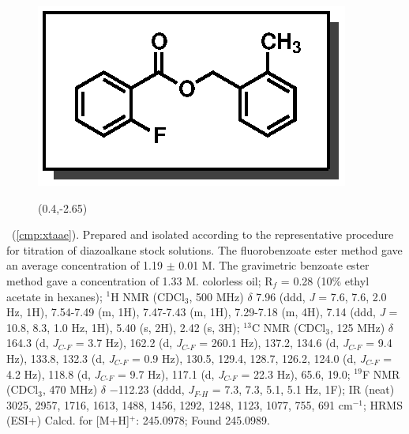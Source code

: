 \pagebreak
\begin{figure}
  \vspace{-18pt}
  \begin{center}
    \includegraphics[scale=0.8]{chp_asymmetric/images/xtaae}
          \begin{textblock}{1}(0.4,-2.65)  \end{textblock}
  \end{center}
  \vspace{-35pt}
\end{figure}\noindent \textbf{\CMPxtaae}\ (\ref{cmp:xtaae}). Prepared and
isolated according to the representative procedure for titration of diazoalkane
stock solutions. The fluorobenzoate ester method gave an average concentration
of 1.19 $\pm$ 0.01 M. The gravimetric benzoate ester method gave a concentration
of 1.33 M. colorless oil; R$_f$ = 0.28 (10\% ethyl acetate in hexanes); $^1$H
NMR (CDCl$_3$, 500 MHz) $\delta$ 7.96 (ddd, \textit{J} = 7.6, 7.6, 2.0 Hz, 1H),
7.54-7.49 (m, 1H), 7.47-7.43 (m, 1H), 7.29-7.18 (m, 4H), 7.14 (ddd, \textit{J} =
10.8, 8.3, 1.0 Hz, 1H), 5.40 (s, 2H), 2.42 (s, 3H); $^{13}$C NMR (CDCl$_3$, 125
MHz) $\delta$ 164.3 (d, \textit{J}$_{C\mbox{-}F}$ = 3.7 Hz), 162.2 (d,
\textit{J}$_{C\mbox{-}F}$ = 260.1 Hz), 137.2, 134.6 (d,
\textit{J}$_{C\mbox{-}F}$ = 9.4 Hz), 133.8, 132.3 (d, \textit{J}$_{C\mbox{-}F}$
= 0.9 Hz), 130.5, 129.4, 128.7, 126.2, 124.0 (d, \textit{J}$_{C\mbox{-}F}$ = 4.2
Hz), 118.8 (d, \textit{J}$_{C\mbox{-}F}$ = 9.7 Hz), 117.1 (d,
\textit{J}$_{C\mbox{-}F}$ = 22.3 Hz), 65.6, 19.0; $^{19}$F NMR (CDCl$_3$, 470
MHz) $\delta$ $-$112.23 (dddd, \textit{J}$_{F\mbox{-}H}$ = 7.3, 7.3, 5.1, 5.1
Hz, 1F); IR (neat) 3025, 2957, 1716, 1613, 1488, 1456, 1292, 1248, 1123, 1077, 755,
691 cm$^{-1}$; HRMS (ESI+) Calcd. for  [M+H]$^+$: 245.0978; Found
245.0989.

